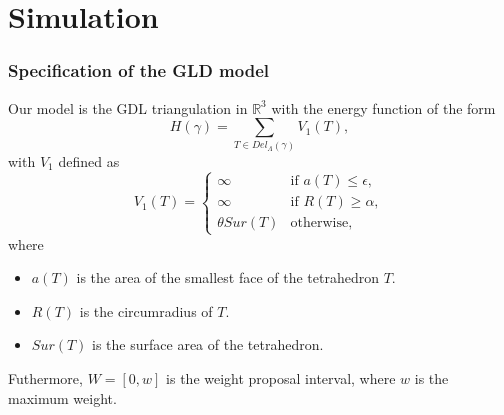 \documentclass[c, 10pt]{beamer}
\begin{document}
\section{Simulation}
\framesection{}




\begin{frame}\frametitle{Specification of the GLD model}
Our model is the GDL triangulation in $\mathbb R^3$ with  the energy function of the form
$$H(\gamma)= \sum_{T \in Del_\Lambda(\gamma)} V_1(T),$$ 
with $V_1$ defined as
\begin{equation}\label{model}
V_1(T) = 
\left\{
    \begin{array}{ll}
        \infty & \mbox{if } a(T)\leq \epsilon, \\
        \infty & \mbox{if } R(T)\geq \alpha, \\
        \theta Sur(T) & \mbox{otherwise, }
    \end{array}
\right. 
\end{equation}
where
\begin{itemize}
\item $a(T)$ is the area of the smallest face of the tetrahedron $T$.
\item $R(T)$ is the circumradius of $T$.
\item $Sur(T)$ is the surface area of the tetrahedron.
\end{itemize}

Futhermore, $W = [0,w]$ is the weight proposal interval, where $w$ is the maximum weight.

\end{frame}
\end{document}
